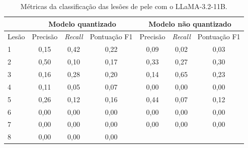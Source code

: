 \begin{table}[ht]
    \caption{\small Métricas da classificação das lesões de pele com o \ac{LLaMA}-3.2-11B.}
    \centering
    \begin{tabular}{l|c|c|c|c|c|c}
        \hline
              & \multicolumn{3}{c|}{Modelo quantizado} & \multicolumn{3}{c}{Modelo não quantizado}
        \\ \hline
        Lesão & Precisão                               & \textit{Recall}                           & Pontuação
        F1    & Precisão                               & \textit{Recall}                           & Pontuação
        F1
        \\ \hline
        1     & 0,15                                   & 0,42                                      & 0,22
              & 0,09                                   & 0,02                                      & 0,03
        \\
        2     & 0,50                                   & 0,10                                      & 0,17
              & 0,33                                   & 0,27                                      & 0,30
        \\
        3     & 0,16                                   & 0,28                                      & 0,20
              & 0,14                                   & 0,65                                      & 0,23
        \\
        4     & 0,11                                   & 0,05                                      & 0,07
              & 0,00                                   & 0,00                                      & 0,00
        \\
        5     & 0,26                                   & 0,12                                      & 0,16
              & 0,44                                   & 0,07                                      & 0,12
        \\
        6     & 0,00                                   & 0,00                                      & 0,00
              & 0,00                                   & 0,00                                      & 0,00
        \\
        7     & 0,00                                   & 0,00                                      & 0,00
              & 0,00                                   & 0,00                                      & 0,00
        \\
        8     & 0,00                                   & 0,00                                      & 0,00

\end{tabular}
\end{table}
